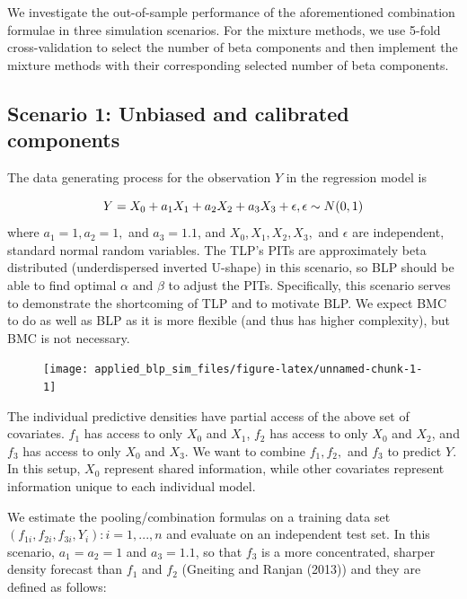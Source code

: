 \documentclass[
]{article}
\begin{document}
We investigate the out-of-sample performance of the aforementioned
combination formulae in three simulation scenarios. For the mixture
methods, we use 5-fold cross-validation to select the number of beta
components and then implement the mixture methods with their
corresponding selected number of beta components.

\hypertarget{scenario-1-unbiased-and-calibrated-components}{%
\subsection{Scenario 1: Unbiased and calibrated
components}\label{scenario-1-unbiased-and-calibrated-components}}

The data generating process for the observation \(Y\) in the regression
model is

\[
Y = X_0+a_1X_1+a_2X_2+a_3X_3+ \epsilon, \\
\epsilon \sim N(0,1)
\] where \(a_1=1,a_2=1,\) and \(a_3=1.1\), and \(X_0,X_1,X_2,X_3,\) and
\(\epsilon\) are independent, standard normal random variables. The
TLP's PITs are approximately beta distributed (underdispersed inverted
U-shape) in this scenario, so BLP should be able to find optimal
\(\alpha\) and \(\beta\) to adjust the PITs. Specifically, this scenario
serves to demonstrate the shortcoming of TLP and to motivate BLP. We
expect BMC to do as well as BLP as it is more flexible (and thus has
higher complexity), but BMC is not necessary.

\begin{figure}[H]

{\centering \texttt{[image: applied\_blp\_sim\_files/figure-latex/unnamed-chunk-1-1]} 

}

\end{figure}

The individual predictive densities have partial access of the above set
of covariates. \(f_1\) has access to only \(X_0\) and \(X_1\), \(f_2\)
has access to only \(X_0\) and \(X_2\), and \(f_3\) has access to only
\(X_0\) and \(X_3\). We want to combine \(f_1,f_2,\) and \(f_3\) to
predict \(Y\). In this setup, \(X_0\) represent shared information,
while other covariates represent information unique to each individual
model.

We estimate the pooling/combination formulas on a training data set
\({(f_{1i} , f_{2i} , f_{3i}, Y_i) : i = 1,..., n}\) and evaluate on an
independent test set. In this scenario, \(a_1 = a_2 = 1\) and
\(a_3 = 1.1\), so that \(f_3\) is a more concentrated, sharper density
forecast than \(f_1\) and \(f_2\) (Gneiting and Ranjan (2013)) and they
are defined as follows:
\end{document}
